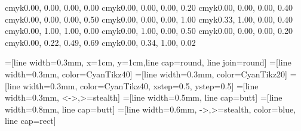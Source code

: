 \definecolor{Blanc}             {cmyk}{0.00, 0.00, 0.00, 0.00}
\definecolor{Gris1}             {cmyk}{0.00, 0.00, 0.00, 0.20}
\definecolor{Gris2}             {cmyk}{0.00, 0.00, 0.00, 0.40}
\definecolor{Gris3}             {cmyk}{0.00, 0.00, 0.00, 0.50}
\definecolor{Noir}              {cmyk}{0.00, 0.00, 0.00, 1.00}
\definecolor{A1}              {cmyk}{0.33, 1.00, 0.00, 0.40}
\definecolor{F1}              {cmyk}{0.00, 1.00, 1.00, 0.00}
\definecolor{C1}              {cmyk}{0.00, 1.00, 0.00, 0.50}
\definecolor{G1}              {cmyk}{0.00, 0.00, 0.00, 0.20}
\definecolor{D1}              {cmyk}{0.00, 0.22, 0.49, 0.69}%
\definecolor{J1}              {cmyk}{0.00, 0.34, 1.00, 0.02}%


=[line width=0.3mm, x=1cm, y=1cm,line cap=round, line join=round]
=[line width=0.3mm, color=CyanTikz40]
=[line width=0.3mm, color=CyanTikz20]
=[line width=0.3mm, color=CyanTikz40, xstep=0.5, ystep=0.5]
=[line width=0.3mm, <->,>=stealth]
=[line width=0.5mm, line cap=butt]
=[line width=0.8mm, line cap=butt]
=[line width=0.6mm, ->,>=stealth, color=blue, line cap=rect]
\newcommand{\quadrillageSeyes}[2]{\draw[line width=0.3mm, color=A1!10, ystep=0.2, xstep=0.8] #1 grid #2;
\draw[line width=0.3mm, color=A1!30, xstep=0.8, ystep=0.8] #1 grid #2; }
\newcommand{\axeX}[4][0]{\draw[axe] (#2,#1)--(#3,#1); \foreach \x in {#4} {\draw (\x,#1) node {\small $+$}; \draw (\x,#1) node[below] {\small $\x$};}}
\newcommand{\axeY}[4][0]{\draw[axe] (#1,#2)--(#1,#3); \foreach \y in {#4} {\draw (#1, \y) node {\small $+$}; \draw (#1, \y) node[left] {\small $\y$};}}
\newcommand{\axeOI}[3][0]{\draw[axe] (#2,#1)--(#3,#1);  \draw (1,#1) node {\small $+$}; \draw (1,#1) node[below] {\small $I$};}
\newcommand{\axeOJ}[3][0]{\draw[axe] (#1,#2)--(#1,#3); \draw (#1, 1) node {\small $+$}; \draw (#1, 1) node[left] {\small $J$};}
\newcommand{\axeXgraduation}[2][0]{\foreach \x in {#2} {\draw (\x,#1) node {\small $+$};}}
\newcommand{\axeYgraduation}[2][0]{\foreach \y in {#2} {\draw (#1, \y) node {\small $+$}; }}
\newcommand{\origine}{\draw (0,0) node[below left] {\small $0$};}
\newcommand{\origineO}{\draw (0,0) node[below left] {$O$};}
\newcommand{\point}[4]{\draw (#1,#2) node[#4] {$#3$};}
\newcommand{\pointGraphique}[4]{\draw (#1,#2) node[#4] {$#3$};
\draw (#1,#2) node[scale=1.5] {$\times$};}
\newcommand{\pointFigure}[4]{\draw (#1,#2) node[#4] {$#3$};
\draw (#1,#2) node[scale=1.5] {$\times$};}
\newcommand{\pointC}[3]{\draw (#1) node[#3] {$#2$};}
\newcommand{\pointCGraphique}[3]{\draw (#1) node[#3] {$#2$};
\draw (#1) node[scale=1.5] {$\times$};}
\newcommand{\pointCFigure}[3]{\draw (#1) node[#3] {$#2$};
\draw (#1) node[scale=1.5] {$\times$};}


